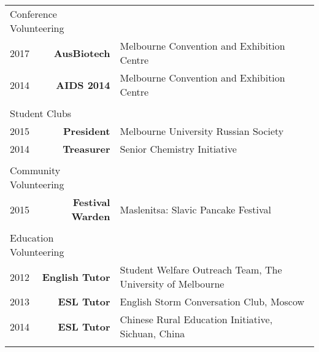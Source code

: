 \documentclass{article}
\begin{document}
\begin{tabularx}{\linewidth}{
							l
							>{\bfseries}r
							X}
	\multicolumn{2}{l}{\large{Conference Volunteering}} \\ \normalsize
		\hspace{0.3cm}	2017 & AusBiotech & Melbourne Convention and Exhibition Centre \\ 
		\hspace{0.3cm}	2014 & AIDS 2014 & Melbourne Convention and Exhibition Centre \\ \\
	\multicolumn{2}{l}{\large{Student Clubs}} \\ \normalsize 
		\hspace{0.3cm}	2015 & President & Melbourne University Russian Society\\
		\hspace{0.3cm}	2014 & Treasurer & Senior Chemistry Initiative \\ \\
	\multicolumn{2}{l}{\large{Community Volunteering}} \\
		\hspace{0.3cm}	2015 & Festival Warden & Maslenitsa: Slavic Pancake Festival \\	\\
	\multicolumn{2}{l}{\large{Education Volunteering}} \\
		\hspace{0.3cm}	2012 & English Tutor & Student Welfare Outreach Team, The University of Melbourne \\
		\hspace{0.3cm} 2013 & ESL Tutor & English Storm Conversation Club, Moscow \\
		\hspace{0.3cm} 2014 & ESL Tutor & Chinese Rural Education Initiative, Sichuan, China \\ \\
	
\end{tabularx}
\end{document}
